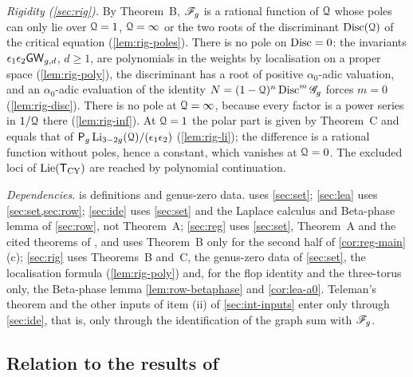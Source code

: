 \emph{Rigidity (\cref{sec:rig}).} By Theorem~B, $\mathscr{F}_g$ is a rational function of $\mathcal{Q}$ whose poles can only lie over $\mathcal{Q}=1$, $\mathcal{Q}=\infty$ or the two roots of the discriminant $\operatorname{Disc}(\mathcal{Q})$ of the critical equation (\cref{lem:rig-poles}). There is no pole on $\operatorname{Disc}=0$: the invariants $\epsilon_1\epsilon_2\mathsf{GW}_{g,d}$, $d\geq1$, are polynomials in the weights by localisation on a proper space (\cref{lem:rig-poly}), the discriminant has a root of positive $\alpha_0$-adic valuation, and an $\alpha_0$-adic evaluation of the identity $N=(1-\mathcal{Q})^n\operatorname{Disc}^m\mathscr{G}_g$ forces $m=0$ (\cref{lem:rig-disc}). There is no pole at $\mathcal{Q}=\infty$, because every factor is a power series in $1/\mathcal{Q}$ there (\cref{lem:rig-inf}). At $\mathcal{Q}=1$ the polar part is given by Theorem~C and equals that of $\mathsf{P}_{g}\operatorname{Li}_{3-2g}(\mathcal{Q})/(\epsilon_1\epsilon_2)$ (\cref{lem:rig-li}); the difference is a rational function without poles, hence a constant, which vanishes at $\mathcal{Q}=0$. The excluded loci of $\mathrm{Lie}(\mathsf{T}_{\mathrm{CY}})$ are reached by polynomial continuation.

\emph{Dependencies.}  is definitions and genus-zero data.  uses \cref{sec:set}; \cref{sec:lea} uses \cref{sec:set,sec:row}; \cref{sec:ide} uses \cref{sec:set} and the Laplace calculus and Beta-phase lemma of \cref{sec:row}, not Theorem~A; \cref{sec:reg} uses \cref{sec:set}, Theorem~A and the cited theorems of \cite{LP2}, and uses Theorem~B only for the second half of \cref{cor:reg-main}(c); \cref{sec:rig} uses Theorems~B and~C, the genus-zero data of \cref{sec:set}, the localisation formula \cite{GP99} (\cref{lem:rig-poly}) and, for the flop identity and the three-torus only, the Beta-phase lemma \cref{lem:row-betaphase} and \cref{cor:lea-a0}. Teleman's theorem and the other inputs of item (ii) of \cref{sec:int-inputs} enter only through \cref{sec:ide}, that is, only through the identification of the graph sum with $\mathscr{F}_g$.

\subsection{Relation to the results of \texorpdfstring{\cite{BS}}{[BS]}}
\label{sec:int-BS}

